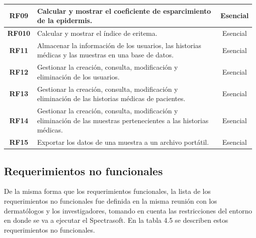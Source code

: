 \begin{table}[h]
\begin{tabulary}{\anchotabla}{|c|J|c|}
			\textbf{RF09} & Calcular y mostrar el coeficiente de esparcimiento de la epidermis. & Esencial\\ \hline

			\textbf{RF010} & Calcular y mostrar el \'{i}ndice de eritema. & Esencial\\ \hline

			\textbf{RF11} & Almacenar la informaci\'{o}n de los usuarios, las historias m\'{e}dicas y las muestras en una base de datos. & Esencial\\ \hline			

			\textbf{RF12} & Gestionar la creaci\'{o}n, consulta, modificaci\'{o}n y eliminaci\'{o}n de los usuarios. & Esencial\\ \hline
			
			\textbf{RF13} & Gestionar la creaci\'{o}n, consulta, modificaci\'{o}n y eliminaci\'{o}n de las historias m\'{e}dicas de pacientes. & Esencial\\ \hline
			
			\textbf{RF14} & Gestionar la creaci\'{o}n, consulta, modificaci\'{o}n y eliminaci\'{o}n de las muestras pertenecientes a las historias m\'{e}dicas. & Esencial\\ \hline	
			
			\textbf{RF15} & Exportar los datos de una muestra a un archivo port\'{a}til. & Esencial\\ \hline
		\end{tabulary}
	\end{table}
	
\subsection{Requerimientos no funcionales}
	
	De la misma forma que los requerimientos funcionales, la lista de los requerimientos no funcionales fue definida en la misma reuni\'{o}n con los dermat\'{o}logos y los investigadores, tomando en cuenta las restricciones del entorno en donde se va a ejecutar el Spectrasoft. En la tabla 4.5 se describen estos requerimientos no funcionales.
	
